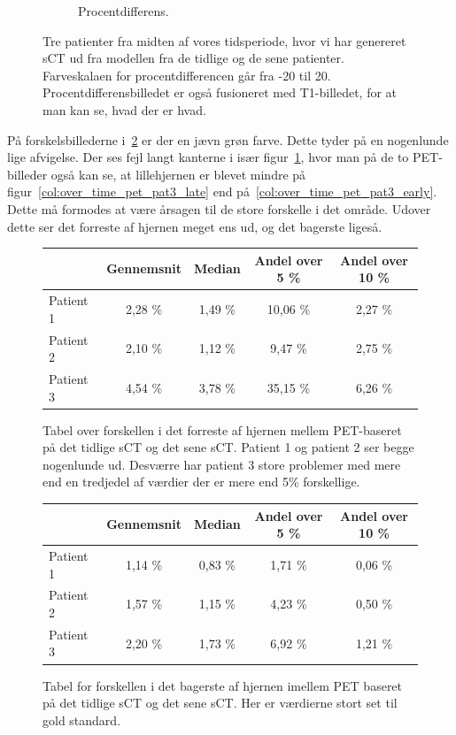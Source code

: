 \begin{figure}[H]
\begin{subfigure}{0.3\textwidth}
        \caption{Procentdifferens.}
        \label{col:over_time_pet_pat3_pd}
    \end{subfigure}
    \caption{Tre patienter fra midten af vores tidsperiode, hvor vi har genereret sCT ud fra modellen fra de tidlige og de sene patienter. Farveskalaen for procentdifferencen går fra -20 til 20. Procentdifferensbilledet er også fusioneret med T1-billedet, for at man kan se, hvad der er hvad.}
    \label{col:over_time_pet}
\end{figure}



På forskelsbillederne i~\ref{col:over_time_pet} er der en jævn grøn farve.
Dette tyder på en nogenlunde lige afvigelse. Der ses fejl langt kanterne
i især figur~\ref{col:over_time_pet_pat3_pd}, hvor man på de to
PET-billeder også kan se, at lillehjernen er blevet mindre på
figur~\ref{col:over_time_pet_pat3_late} end
på~\ref{col:over_time_pet_pat3_early}. Dette må formodes at være
årsagen til de store forskelle i det område. Udover dette ser det forreste af
hjernen meget ens ud, og det bagerste ligeså.

\begin{figure}[H]
    \centering
    \begin{tabular}{| l | c | c | c | c |}
        \hline
         & Gennemsnit & Median & Andel over 5 \% & Andel over 10 \% \\ \hline
        Patient 1 & 2,28 \% & 1,49 \% & 10,06 \% & 2,27 \% \\ \hline
        Patient 2 & 2,10 \% & 1,12 \% & 9,47 \% & 2,75 \% \\ \hline
        Patient 3 & 4,54 \% & 3,78 \% & 35,15 \% & 6,26 \% \\ \hline
    \end{tabular}
    \caption{Tabel over forskellen i det forreste af hjernen mellem PET-baseret på det tidlige sCT og det sene sCT. Patient 1 og patient 2 ser begge nogenlunde ud. Desværre har patient 3 store problemer med mere end en tredjedel af værdier der er mere end 5\% forskellige.}
    \label{tab:over_tid_forresthjerne}
\end{figure}

\begin{figure}[H]
    \centering
    \begin{tabular}{| l | c | c | c | c |}
        \hline
         & Gennemsnit & Median & Andel over 5 \% & Andel over 10 \% \\ \hline
        Patient 1 & 1,14 \% & 0,83 \% & 1,71 \% & 0,06 \% \\ \hline
        Patient 2 & 1,57 \% & 1,15 \% & 4,23 \% & 0,50 \% \\ \hline
        Patient 3 & 2,20 \% & 1,73 \% & 6,92 \% & 1,21 \% \\ \hline
    \end{tabular}
    \caption{Tabel for forskellen i det bagerste af hjernen imellem PET baseret på det tidlige sCT og det sene sCT. Her er værdierne stort set til gold standard.}
    \label{tab:over_tid_bagersthjerne}
\end{figure}

